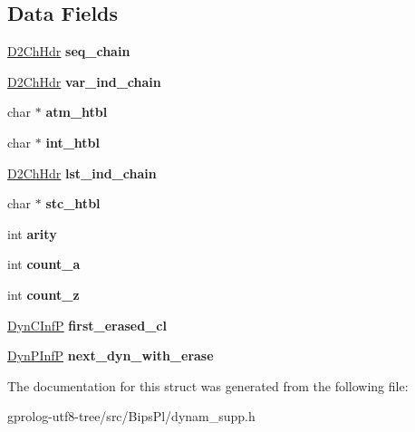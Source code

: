 \subsection*{Data Fields}
\begin{DoxyCompactItemize}
\item 
\hyperlink{structD2ChHdr}{D2\+Ch\+Hdr} {\bfseries seq\+\_\+chain}\hypertarget{structdynpinf_a7fd9dcc867aa4461a78fd7ea113fe30e}{}\label{structdynpinf_a7fd9dcc867aa4461a78fd7ea113fe30e}

\item 
\hyperlink{structD2ChHdr}{D2\+Ch\+Hdr} {\bfseries var\+\_\+ind\+\_\+chain}\hypertarget{structdynpinf_a81ff1365c770d4e9e503ec13d0829c89}{}\label{structdynpinf_a81ff1365c770d4e9e503ec13d0829c89}

\item 
char $\ast$ {\bfseries atm\+\_\+htbl}\hypertarget{structdynpinf_a647b214d180d3239102e9a3137cd2c50}{}\label{structdynpinf_a647b214d180d3239102e9a3137cd2c50}

\item 
char $\ast$ {\bfseries int\+\_\+htbl}\hypertarget{structdynpinf_a7e89d876755097ac24867ef0c002572d}{}\label{structdynpinf_a7e89d876755097ac24867ef0c002572d}

\item 
\hyperlink{structD2ChHdr}{D2\+Ch\+Hdr} {\bfseries lst\+\_\+ind\+\_\+chain}\hypertarget{structdynpinf_a1c4ab87dddfafc7e912446a2cc391e3f}{}\label{structdynpinf_a1c4ab87dddfafc7e912446a2cc391e3f}

\item 
char $\ast$ {\bfseries stc\+\_\+htbl}\hypertarget{structdynpinf_a34e514b87f630efa4c7d2936979e7735}{}\label{structdynpinf_a34e514b87f630efa4c7d2936979e7735}

\item 
int {\bfseries arity}\hypertarget{structdynpinf_a06c4048e8638d3a47c4b48d5b6384516}{}\label{structdynpinf_a06c4048e8638d3a47c4b48d5b6384516}

\item 
int {\bfseries count\+\_\+a}\hypertarget{structdynpinf_aacc4edd647989f5a014730830390c05d}{}\label{structdynpinf_aacc4edd647989f5a014730830390c05d}

\item 
int {\bfseries count\+\_\+z}\hypertarget{structdynpinf_a90b999f0c08d5d26be5de1f30fd4a83d}{}\label{structdynpinf_a90b999f0c08d5d26be5de1f30fd4a83d}

\item 
\hyperlink{structdyncinf}{Dyn\+C\+InfP} {\bfseries first\+\_\+erased\+\_\+cl}\hypertarget{structdynpinf_a1e974f17af18887bef7754c00313c714}{}\label{structdynpinf_a1e974f17af18887bef7754c00313c714}

\item 
\hyperlink{structdynpinf}{Dyn\+P\+InfP} {\bfseries next\+\_\+dyn\+\_\+with\+\_\+erase}\hypertarget{structdynpinf_a5845421aa8bf227923c6ed1073c32b17}{}\label{structdynpinf_a5845421aa8bf227923c6ed1073c32b17}

\end{DoxyCompactItemize}


The documentation for this struct was generated from the following file\+:\begin{DoxyCompactItemize}
\item 
gprolog-\/utf8-\/tree/src/\+Bips\+Pl/dynam\+\_\+supp.\+h\end{DoxyCompactItemize}

